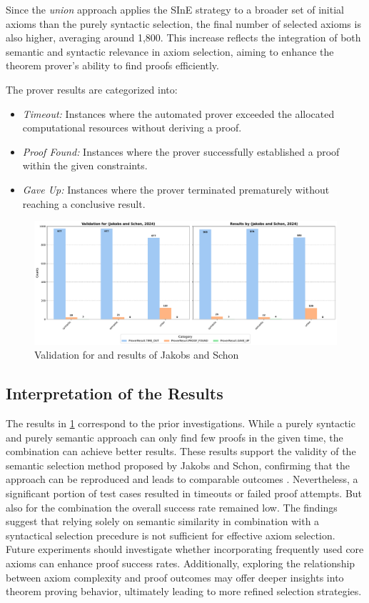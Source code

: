 \documentclass[english,version-2020-11]{uzl-thesis}
\begin{document}
Since the \textit{union} approach applies the SInE strategy to a broader set of initial axioms than the purely syntactic selection, the final number of selected axioms is also higher, averaging around 1,800. This increase reflects the integration of both semantic and syntactic relevance in axiom selection, aiming to enhance the theorem prover’s ability to find proofs efficiently.

The prover results are categorized into:
\begin{itemize}
    \item \textit{Timeout:} Instances where the automated prover exceeded the allocated computational resources without deriving a proof.
    \item \textit{Proof Found:} Instances where the prover successfully established a proof within the given constraints.
    \item \textit{Gave Up:} Instances where the prover terminated prematurely without reaching a conclusive result.
\end{itemize}

\begin{figure}[ht]
    \centering
    \includegraphics[width=\textwidth]{comparison_output.pdf}
    \caption{Validation for and results of Jakobs and Schon \cite{Schon2024}}
    \label{fig:reengineering}
\end{figure}

\subsection{Interpretation of the Results}

The results in \ref{fig:reengineering} correspond to the prior investigations. While a purely syntactic and purely semantic approach can only find few proofs in the given time, the combination can achieve better results.
These results support the validity of the semantic selection method proposed by Jakobs and Schon, confirming that the approach can be reproduced and leads to comparable outcomes \cite{Schon2024}.
Nevertheless, a significant portion of test cases resulted in timeouts or failed proof attempts. But also for the combination the overall success rate remained low.
The findings suggest that relying solely on semantic similarity in combination with a syntactical selection precedure is not sufficient for effective axiom selection. Future experiments should investigate whether incorporating frequently used core axioms can enhance proof success rates. Additionally, exploring the relationship between axiom complexity and proof outcomes may offer deeper insights into theorem proving behavior, ultimately leading to more refined selection strategies.
\end{document}
